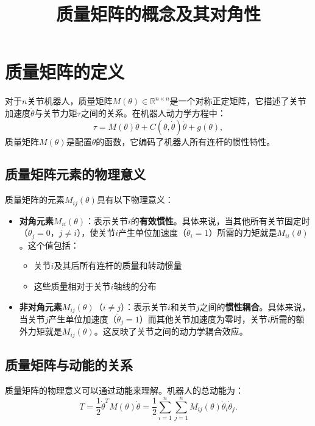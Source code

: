 \documentclass{article}
\title{质量矩阵的概念及其对角性}
\author{}
\date{}
\begin{document}
\maketitle

\section{质量矩阵的定义}

对于$n$关节机器人，质量矩阵$M(\theta) \in \mathbb{R}^{n \times n}$是一个对称正定矩阵，它描述了关节加速度$\ddot{\theta}$与关节力矩$\tau$之间的关系。在机器人动力学方程中：
\begin{equation}
\tau = M(\theta)\ddot{\theta} + C(\theta, \dot{\theta})\dot{\theta} + g(\theta),
\end{equation}
质量矩阵$M(\theta)$是配置$\theta$的函数，它编码了机器人所有连杆的惯性特性。

\subsection{质量矩阵元素的物理意义}

质量矩阵的元素$M_{ij}(\theta)$具有以下物理意义：

\begin{itemize}
\item \textbf{对角元素$M_{ii}(\theta)$}：表示关节$i$的\textbf{有效惯性}。具体来说，当其他所有关节固定时（$\ddot{\theta}_j = 0$，$j \neq i$），使关节$i$产生单位加速度（$\ddot{\theta}_i = 1$）所需的力矩就是$M_{ii}(\theta)$。这个值包括：
\begin{itemize}
\item 关节$i$及其后所有连杆的质量和转动惯量
\item 这些质量相对于关节$i$轴线的分布
\end{itemize}

\item \textbf{非对角元素$M_{ij}(\theta)$}（$i \neq j$）：表示关节$i$和关节$j$之间的\textbf{惯性耦合}。具体来说，当关节$j$产生单位加速度（$\ddot{\theta}_j = 1$）而其他关节加速度为零时，关节$i$所需的额外力矩就是$M_{ij}(\theta)$。这反映了关节之间的动力学耦合效应。
\end{itemize}

\subsection{质量矩阵与动能的关系}

质量矩阵的物理意义可以通过动能来理解。机器人的总动能为：
\begin{equation}
T = \frac{1}{2}\dot{\theta}^T M(\theta)\dot{\theta} = \frac{1}{2}\sum_{i=1}^{n}\sum_{j=1}^{n} M_{ij}(\theta)\dot{\theta}_i\dot{\theta}_j.
\end{equation}
\end{document}
